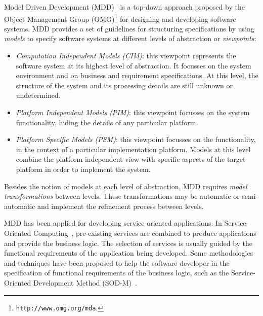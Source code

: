 Model Driven Development (MDD)~\cite{Favre06arigorous} is a top-down approach proposed by the Object Management Group
(OMG)\footnote{\texttt{http://www.omg.org/mda}.} for designing and developing software systems. 
MDD provides a set of guidelines for  structuring  specifications by using \textit{models} to specify software systems at different levels of abstraction or \textit{viewpoints}:

\begin{itemize}

\item
\textit{Computation Independent Models (CIM)}: this viewpoint represents the software system at its highest level of abstraction. It focusses on the system
environment and on  business and requirement specifications. 
At this level, the structure of the system  and its processing details are still unknown or undetermined. 
\item
\textit{Platform Independent Models (PIM)}: this viewpoint focusses on the system functionality, hiding the details of any particular platform. 
\item
\textit{Platform Specific Models (PSM)}: this viewpoint focusses on the functionality, in the context of a particular implementation platform.
Models at this level combine the platform-independent view with specific aspects of the target platform in order to implement the system.  
\end{itemize}

Besides the notion of models at each level of abstraction, MDD requires  \textit{model transformations} between levels.
These transformations may be automatic or semi-automatic and implement the refinement process between levels. 

MDD has been applied for developing service-oriented applications.
In Service-Oriented Computing~\cite{scube2010book}, pre-existing services are
combined to produce applications and provide the business logic. The selection of services is usually guided by the functional requirements of the application being developed. 
Some methodologies and techniques have been proposed to help the software
developer in the specification of functional requirements of the business logic,
such as the Service-Oriented Development Method
(SOD-M)~\cite{decastro1}. 

